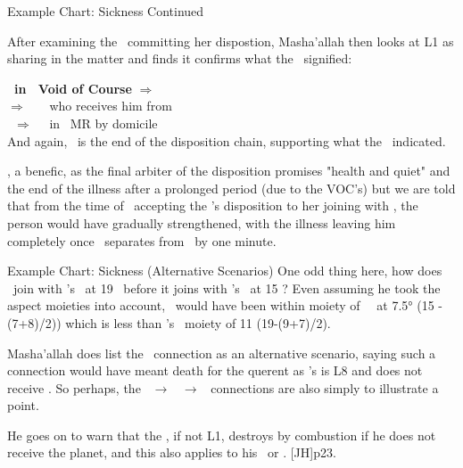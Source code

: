 \begin{frame}[t]{Example Chart: Sickness Continued}

After examining the \Moon\ committing her dispostion, Masha'allah then looks at L1 as sharing in the matter and finds it confirms what the \Moon\ signified:

\textbf{\Mercury\ in \Aries\ Void of Course} $\Rightarrow$ \Taurus \\
$\Rightarrow$ \Sextile\ \Venus\ \Pisces\ who receives him from \Taurus \\
\Venus\ $\Rightarrow$ \Trine\ \Jupiter\ in \Taurus\, MR by domicile \\
And again, \Jupiter\ is the end of the disposition chain, supporting what the \Moon\ indicated.
\vspace{0.2cm}

\Jupiter, a benefic, as the final arbiter of the disposition promises "health and quiet" and the end of the illness after a prolonged period (due to the VOC's) but we are told that from the time of \Venus\ accepting the \Moon's disposition to her joining with \Jupiter, the person would have gradually strengthened, with the illness leaving him completely once \Venus\ separates from \Jupiter\ by one minute.

\end{frame}
\begin{frame}[t]{Example Chart: Sickness (Alternative Scenarios)}
One odd thing here, how does \Venus\ join with \Jupiter's \Sextile\ at 19 \Pisces\ before it joins with \Mars's \Square\ at 15 \Pisces? Even assuming he took the aspect moieties into account, \Venus\ would have been within moiety of \Mars\ \Square\ at 7.5° \Pisces (15 - (7+8)/2)) which is less than \Jupiter's \Sextile\ moiety of 11 \Pisces (19-(9+7)/2). 

\vspace{0.3cm}
Masha'allah does list the \Mars\ connection as an alternative scenario, saying such a connection would have meant death for the querent as \Mars's is L8 and does not receive \Venus. So perhaps, the \Moon\ $\rightarrow$ \Venus\ $\rightarrow$ \Jupiter\ connections are also simply to illustrate a point.

He goes on to warn that the \Sun, if not L1, destroys by combustion if he does not receive the planet, and this also applies to his \Square\ or \Opposition. [JH]p23.\footnotemark[1]

\end{frame}